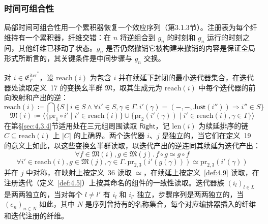 \subsubsection{时间可组合性}\label{sec:4.4.2}

局部时间可组合性用一个累积器恢复一个效应序列（第3.1.3节）。注册表为每个纤维持有一个累积器，纤维交错：在 $n$ 将逆组合到 $g_n$ 的时刻和 $g_n$ 运行的时刻之间，其他纤维已移动了状态。$g_n$ 是否仍然撤销它被构建来撤销的内容是保证全局形式所断言的，其关键条件是中间步骤与 $g_n$ 交换。

\begin{definition}\label{def:4.13}
对 $i \in \mathfrak{E}^{\mathrm{iter}^*}_\Gamma$，设 $\mathrm{reach}(i)$ 为包含 $i$ 并在续延下封闭的最小迭代器集合，在迭代器处读取定义~17 的变换幺半群 $\mathfrak{M}$，取其生成元为 $\mathrm{reach}(i)$ 中每个迭代器的前向映射和产出的逆：
\begin{equation}\label{eq:4.21}
\mathrm{reach}(i) \coloneqq \bigcap \{S \mid i \in S \land \forall i' \in S, \gamma \in \Gamma.\, i'(\gamma) = (-, -, \mathsf{Just}(i'')) \Rightarrow i'' \in S\}
\end{equation}
\begin{equation}\label{eq:4.22}
\mathfrak{M}(i) \coloneqq \langle \{\mathrm{pr}_1 \circ i' \mid i' \in \mathrm{reach}(i)\} \cup \{\mathrm{pr}_2(i'(\gamma)) \mid i' \in \mathrm{reach}(i), \gamma \in \Gamma\}\rangle
\end{equation}
在第\S\ref{sec:4.3.4}节适用处在三元组周围读取 $\mathsf{Right}$，记 $\mathrm{len}(i)$ 为续延排序的链 $C \subseteq \mathrm{reach}(i)$ 上 $|C|$ 的上确界。两个迭代器 $i$、$j$ 是独立的，当它们在定义~19 的意义上如此，以这些变换幺半群读取，以迭代产出的逆连同其续延为迭代产出：
\begin{equation}\label{eq:4.23}
\forall f \in \mathfrak{M}(i), g \in \mathfrak{M}(j).\, f \circ g \simeq g \circ f
\end{equation}
\begin{equation}\label{eq:4.24}
\forall i' \in \mathrm{reach}(i), g \in \mathfrak{M}(j), \gamma \in \Gamma.\, \mathrm{pr}_{2,3}(i'(g(\gamma))) \simeq \mathrm{pr}_{2,3}(i'(\gamma))
\end{equation}
并在 $j$ 中对称，在映射上按定义~36 读取 $\simeq$，在续延上按定义~\ref{def:4.9} 读取，在注册迭代（定义~\ref{def:4.5}）上按其命名的组件的一致性读取。迭代器族 $(i_l)_{l \in L}$ 是两两独立的，当对每个 $l \neq l'$ 有 $i_l$ 和 $i_{l'}$ 独立，步骤序列是两两独立的，当 $(e_n)_{n \in N}$ 如此，其中 $N$ 是序列曾持有的名称集合，每个对应编排器插入的纤维和迭代注册的纤维。
\end{definition}

